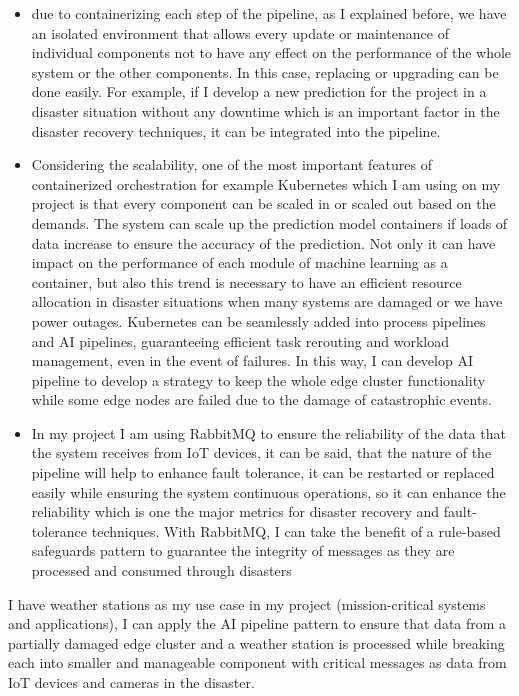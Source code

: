 \documentclass{article}
\begin{document}
\begin{itemize}
    \item{due to containerizing each step of the pipeline, as I explained before, we have an isolated environment that allows every update or maintenance of individual components not to have any effect on the performance of the whole system or the other components. In this case, replacing or upgrading can be done easily. For example, if I develop a new prediction for the project in a disaster situation without any downtime which is an important factor in the disaster recovery techniques, it can be integrated into the pipeline. }
    \item{Considering the scalability, one of the most important features of containerized orchestration for example Kubernetes which I am using on my project is that every component can be scaled in or scaled out based on the demands. The system can scale up the prediction model containers if loads of data increase to ensure the accuracy of the prediction. Not only it can have impact on the performance of each module of machine learning as a container, but also this trend is necessary to have an efficient resource allocation in disaster situations when many systems are damaged or we have power outages. Kubernetes can be seamlessly added into process pipelines and AI pipelines, guaranteeing efficient task rerouting and workload management, even in the event of failures. In this way, I can develop AI pipeline to develop a strategy to keep the whole edge cluster functionality while some edge nodes are failed due to the damage of catastrophic events.}
    \item{In my project I am using RabbitMQ to ensure the reliability of the data that the system receives from IoT devices, it can be said, that the nature of the pipeline will help to enhance fault tolerance, it can be restarted or replaced easily while ensuring the system continuous operations, so it can enhance the reliability which is one the major metrics for disaster recovery and fault-tolerance techniques. With RabbitMQ, I can take the benefit of a rule-based safeguards pattern to guarantee the integrity of messages as they are processed and consumed through disasters }
\end{itemize}
I have weather stations as my use case in my project (mission-critical systems and applications), I can apply the AI pipeline pattern to ensure that data from a partially damaged edge cluster and a weather station is processed while breaking each into smaller and manageable component with critical messages as data from IoT devices and cameras in the disaster.
\end{document}
